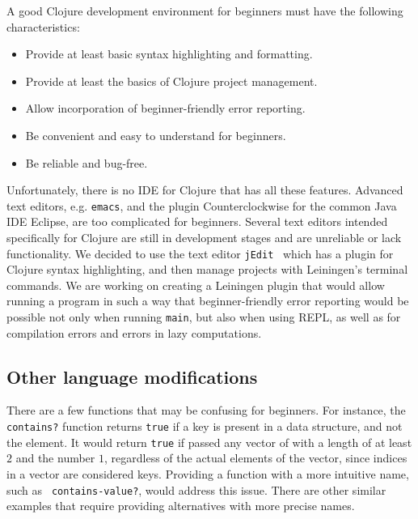 \documentclass[submission,copyright,creativecommons]{eptcs}
\newcommand{\allcomments}[1]{{#1}}
\newcommand{\elenacomment}[1]{{\bf \textcolor{ForestGreen}{\allcomments{{#1}}}}}
\newcommand{\stephencomment}[1]{{\bf \color{StephensBlue}{\allcomments{{#1}}}}} %
\begin{document}
A good Clojure development environment for beginners %
 must have the following characteristics: 
\begin{itemize}
\item Provide at least basic syntax highlighting and formatting. 
\item Provide at least the basics of Clojure project management. 
\item Allow incorporation of beginner-friendly error reporting. 
\item Be convenient and easy to understand for beginners.
\item Be reliable and bug-free.
\end{itemize}
Unfortunately, there is no IDE for Clojure that has all these features. 
Advanced text editors, e.g. {\tt emacs}, and the plugin Counterclockwise for the common Java IDE Eclipse, are too complicated for beginners. Several text editors intended specifically for Clojure are still in development stages and are unreliable or lack functionality. We decided to use the text editor {\tt jEdit}~\cite{jedit} which has a plugin for Clojure syntax highlighting, and then manage projects with Leiningen's terminal commands. We are working on creating  a Leiningen plugin that would allow running a program in such a way that beginner-friendly error reporting would be possible not only when running {\tt main}, but also when using REPL, as well as for compilation errors and errors in lazy computations. 


\subsection{Other language modifications}\label{subsec:other}
There are a few functions that may be confusing
 for beginners. For instance, the {\tt contains?} function returns {\tt true} if a key is present in a data structure, and not the element. It would return {\tt true} if passed any vector of with a length of at least $2$ and the number $1$, regardless of the actual elements of the vector, since indices in a vector are considered keys. Providing a function with a more intuitive name, such as {\tt 
contains-value?}, would address this issue. 
There are other similar examples that require providing alternatives with more precise names.
\end{document}
